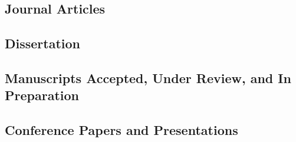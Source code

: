 {\Large{}}
%
\begin{adjustwidth}{1in}{0.15in}
	\newrefsection\nocite{*}
	\subsection*{Journal Articles}
	\printbibliography[heading=none,type=article]
																								
	\newrefsection\nocite{*}
	\subsection*{Dissertation}
	\printbibliography[heading=none, type=thesis]
																								
	\newrefsection\nocite{*}
	\subsection*{Manuscripts Accepted, Under Review, and In Preparation}
	\printbibliography[heading=none,type=unpublished]
																								
	\newrefsection\nocite{*}
	\subsection*{Conference Papers and Presentations}
	\printbibliography[heading=none, type=inproceedings]
\end{adjustwidth}
